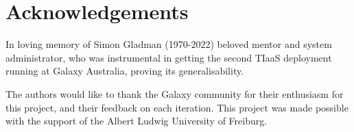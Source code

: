 \section*{Acknowledgements}
In loving memory of Simon Gladman (1970-2022) beloved mentor and system administrator, who was instrumental in getting the second TIaaS deployment running at Galaxy Australia, proving its generalisability.

The authors would like to thank the Galaxy community for their enthusiasm for this project, and their feedback on each iteration.
This project was made possible with the support of the Albert Ludwig University of Freiburg.

\footnotesize


\normalsize
